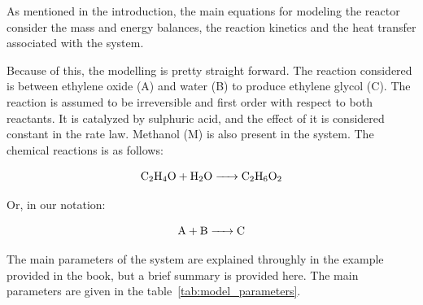 As mentioned in the introduction, the main equations for modeling the reactor consider the mass and energy balances, the reaction kinetics and the heat transfer associated with the system. 

Because of this, the modelling is pretty straight forward. The reaction considered is between ethylene oxide (A) and water (B) to produce ethylene glycol (C). The reaction is assumed to be irreversible and first order with respect to both reactants. It is catalyzed by sulphuric acid, and the effect of it is considered constant in the rate law. Methanol (M) is also present in the system. The chemical reactions is as follows:

\[
\ce{C2H4O + H2O -> C2H6O2}
\]

Or, in our notation:

\[
\ce{A + B -> C}
\]

The main parameters of the system are explained throughly in the example provided in the book, but a brief summary is provided here. The main parameters are given in the table~\ref{tab:model_parameters}. 

